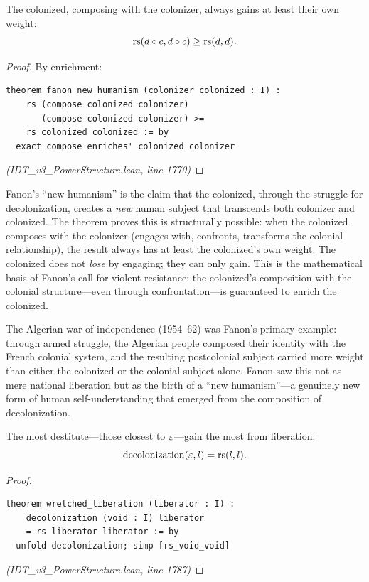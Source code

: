 \begin{theorem}
\label{thm:fanon-new-humanism}
The colonized, composing with the colonizer, always gains at least their own
weight:
\[
  \mathrm{rs}(d \circ c, d \circ c) \geq \mathrm{rs}(d, d).
\]
\end{theorem}

\begin{proof}
By enrichment:
\begin{lstlisting}
theorem fanon_new_humanism (colonizer colonized : I) :
    rs (compose colonized colonizer)
       (compose colonized colonizer) >=
    rs colonized colonized := by
  exact compose_enriches' colonized colonizer
\end{lstlisting}
\textit{(IDT\_v3\_PowerStructure.lean, line 1770)}
\end{proof}

\begin{interpretation}
Fanon's ``new humanism'' is the claim that the colonized, through the struggle
for decolonization, creates a \emph{new} human subject that transcends both
colonizer and colonized. The theorem proves this is structurally possible:
when the colonized composes with the colonizer (engages with, confronts,
transforms the colonial relationship), the result always has at least the
colonized's own weight. The colonized does not \emph{lose} by engaging; they
can only gain. This is the mathematical basis of Fanon's call for violent
resistance: the colonized's composition with the colonial structure---even
through confrontation---is guaranteed to enrich the colonized.

The Algerian war of independence (1954--62) was Fanon's primary example: through
armed struggle, the Algerian people composed their identity with the French
colonial system, and the resulting postcolonial subject carried more weight than
either the colonized or the colonial subject alone. Fanon saw this not as mere
national liberation but as the birth of a ``new humanism''---a genuinely new
form of human self-understanding that emerged from the composition of
decolonization.
\end{interpretation}

\begin{theorem}
\label{thm:wretched-liberation}
The most destitute---those closest to $\varepsilon$---gain the most from liberation:
\[
  \mathrm{decolonization}(\varepsilon, l) = \mathrm{rs}(l, l).
\]
\end{theorem}

\begin{proof}
\begin{lstlisting}
theorem wretched_liberation (liberator : I) :
    decolonization (void : I) liberator
    = rs liberator liberator := by
  unfold decolonization; simp [rs_void_void]
\end{lstlisting}
\textit{(IDT\_v3\_PowerStructure.lean, line 1787)}
\end{proof}

